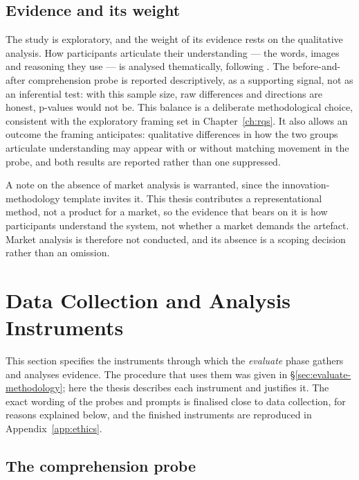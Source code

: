 \subsection{Evidence and its weight}
\label{subsec:evaluate-weight}
 
The study is exploratory, and the weight of its evidence rests on the qualitative analysis. How participants articulate their understanding --- the words, images and reasoning they use --- is analysed thematically, following \citet{braunclarke2006}. The before-and-after comprehension probe is reported descriptively, as a supporting signal, not as an inferential test: with this sample size, raw differences and directions are honest, p-values would not be. This balance is a deliberate methodological choice, consistent with the exploratory framing set in Chapter~\ref{ch:rqs}. It also allows an outcome the framing anticipates: qualitative differences in how the two groups articulate understanding may appear with or without matching movement in the probe, and both results are reported rather than one suppressed.
 
A note on the absence of market analysis is warranted, since the innovation-methodology template invites it. This thesis contributes a representational method, not a product for a market, so the evidence that bears on it is how participants understand the system, not whether a market demands the artefact. Market analysis is therefore not conducted, and its absence is a scoping decision rather than an omission.

\section{Data Collection and Analysis Instruments}
\label{sec:instruments}
 
This section specifies the instruments through which the \emph{evaluate} phase gathers and analyses evidence. The procedure that uses them was given in \S\ref{sec:evaluate-methodology}; here the thesis describes each instrument and justifies it. The exact wording of the probes and prompts is finalised close to data collection, for reasons explained below, and the finished instruments are reproduced in Appendix~\ref{app:ethics}.
 
\subsection{The comprehension probe}
\label{subsec:instr-probe}
 

